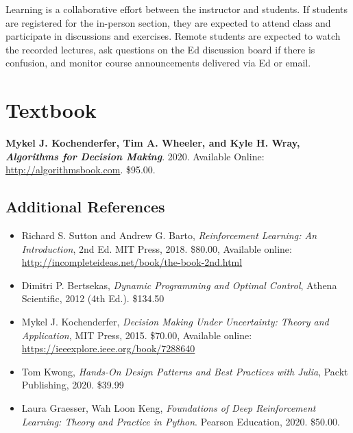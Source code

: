 \documentclass[9pt]{article}
\begin{document}
Learning is a collaborative effort between the instructor and students. If students are registered for the in-person section, they are expected to attend class and participate in discussions and exercises. Remote students are expected to watch the recorded lectures, ask questions on the Ed discussion board if there is confusion, and monitor course announcements delivered via Ed or email.

\section*{Textbook}

\textbf{Mykel J. Kochenderfer, Tim A. Wheeler, and Kyle H. Wray, \textit{Algorithms for Decision Making}}. 2020. Available Online: \url{http://algorithmsbook.com}. \$95.00.

\subsection*{Additional References}

\begin{itemize}[noitemsep]
    \item Richard S. Sutton and Andrew G. Barto, \textit{Reinforcement Learning: An Introduction}, 2nd Ed. MIT Press, 2018. \$80.00, Available online: \url{http://incompleteideas.net/book/the-book-2nd.html}
    \item Dimitri P. Bertsekas, \textit{Dynamic Programming and Optimal Control}, Athena Scientific, 2012 (4th Ed.). \$134.50
    \item Mykel J. Kochenderfer, \textit{Decision Making Under Uncertainty: Theory and Application}, MIT Press, 2015. \$70.00, Available online: \url{https://ieeexplore.ieee.org/book/7288640}
    \item Tom Kwong, \textit{Hands-On Design Patterns and Best Practices with Julia}, Packt Publishing, 2020. \$39.99
    \item Laura Graesser, Wah Loon Keng, \textit{Foundations of Deep Reinforcement Learning: Theory and Practice in Python}. Pearson Education, 2020. \$50.00.
\end{itemize}
\end{document}
